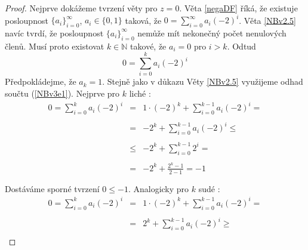 \documentclass[czech,bachelor,dept470,male]{diploma}
\newcommand{\posla}{\{a_i\}_{i=0}^{\infty}}
\begin{document}
\begin{proof}
	Nejprve dokážeme tvrzení věty pro $z = 0$. Věta \ref{negaDF} říká, že existuje posloupnost $\posla$, $a_i \in \{0, 1\}$ taková, že $ 0 = \sum_{i=0}^{\infty}a_i(-2)^i$.
	Věta \ref{NBv2.5} navíc tvrdí, že posloupnost $\posla$ nemůže mít nekonečný počet nenulových členů. Musí proto existovat $k \in \mathbb{N}$ takové, že $a_i = 0$ pro $i > k$. Odtud
	\begin{equation}\label{NBv3e1}
		0 = \sum_{i=0}^{k}a_i(-2)^i
	\end{equation}
	Předpokládejme, že $a_k = 1$. Stejně jako v důkazu Věty \ref{NBv2.5} využijeme odhad součtu (\ref{NBv3e1}). Nejprve pro $k$ liché :
	\begin{equation}\label{NBv3e2}
		\begin{array}{rcl}
			0 = \sum_{i=0}^{k}a_i(-2)^i & =    & 1\cdot(-2)^{k} + \sum_{i=0}^{k-1}a_i(-2)^i =        \\
			                            &      &                                                     \\
			                            & =    & - 2^{k} + \sum_{i=0}^{k-1}a_i(-2)^i \leq            \\
			                            &      &                                                     \\
			                            & \leq & - 2^{k} + \sum_{i=0}^{k-1}2^i =                     \\
			                            &      &                                                     \\
			                            & =    & \displaystyle{- 2^{k} + \frac{2^{k} - 1}{2-1} = -1} \\
			                            &      &                                                     \\
		\end{array}
	\end{equation}
	Dostáváme sporné tvrzení $0 \leq -1$. Analogicky pro $k$ sudé :
	\begin{equation}\label{NBv3e3}
		\begin{array}{rcl}
			0 = \sum_{i=0}^{k}a_i(-2)^i & =    & 1\cdot(-2)^{k} + \sum_{i=0}^{k-1}a_i(-2)^i =      \\
			                            &      &                                                   \\
			                            & =    & 2^{k} + \sum_{i=0}^{k-1}a_i(-2)^i \geq            \\

\end{array}
\end{equation}
\end{proof}
\end{document}
